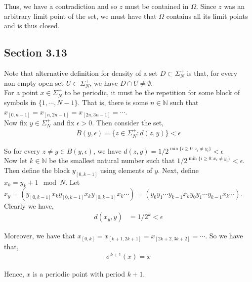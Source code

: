 \documentclass[12pt]{article}
\newenvironment{problem}[2][Problem]{\begin{trivlist}
\item[\hskip \labelsep {\bfseries #1}\hskip \labelsep {\bfseries #2.}]}{\end{trivlist}}
\begin{document}
Thus, we have a contradiction and so $z$ must be contained in $\Omega$. Since $z$ was an arbitrary limit point of the set, we must have that $\Omega$ contains all its limit points and is thus closed.

\subsection{Section 3.13}

\begin{problem}{1}
\end{problem}

Note that alternative definition for density of a set $D \subset \Sigma_N^+$ is that, for every non-empty open set $U \subset \Sigma_N^+$, we have $D \cap U \neq \emptyset$.\\
 
For a point $x \in \Sigma_N^+$ to be periodic, it must be the repetition for some block of symbols in $\{1, \cdots, N-1\}$. That is, there is some $n \in \mathbb{N}$ such that $x_{[0, n-1]} = x_{[n, 2n-1]} = x_{[2n, 3n-1]} = \cdots$.\\

Now fix $y \in \Sigma_N^+$ and fix $\epsilon > 0$. Then consider the set,
\begin{align*}
B(y, \epsilon) = \{z \in \Sigma_N^+: d(z, y)\} < \epsilon
\end{align*}

So for every $z \neq y \in B(y, \epsilon)$, we have $d(z, y) = 1/2^{\min \{i \geq 0: z_i \neq y_i\}} < \epsilon$\\

Now let $k \in \mathbb{N}$ be the smallest natural number such that $1/2^{\min \{i \geq 0: x_i \neq y_i\}} < \epsilon$. Then define the block $y_{[0, k-1]}$ using elements of $y$. Next, define $x_k = y_k + 1 \mod N$. Let $x_y = (y_{[0, k-1]}x_ky_{[0, k-1]}x_ky_{[0, k-1]}x_k\cdots) = (y_0y_1\cdots y_{k-1}x_ky_0y_1\cdots y_{k-1}x_k\cdots)$. Clearly we have,
\begin{align*}
d(x_y, y) &= 1/2^k < \epsilon
\end{align*}

Moreover, we have that $x_{[0, k]} = x_{[k+1, 2k+1]} = x_{[2k+2, 3k+2]} = \cdots$. So we have that,
\begin{align*}
\sigma^{k+1}(x) = x
\end{align*}

Hence, $x$ is a periodic point with period $k+1$.\\
\end{document}
